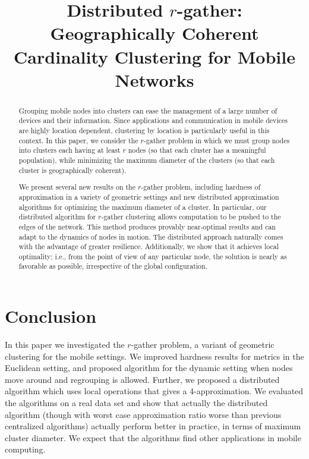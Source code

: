 \documentclass[conference]{IEEEtran}
\title{Distributed $r$-gather: Geographically Coherent Cardinality Clustering for Mobile Networks}
\begin{document}
\maketitle


\begin{abstract}

Grouping mobile nodes into clusters can ease the management of a large number of devices and their information. Since applications and communication in mobile devices are highly location dependent, clustering by location is particularly useful in this context. In this paper, we consider the $r$-gather problem in which we must group nodes into clusters each having at least $r$ nodes (so that each cluster has a meaningful population), while minimizing the maximum diameter of the clusters (so that each cluster is geographically coherent).

We present several new results on the $r$-gather problem, including hardness of approximation in a variety of geometric settings and new distributed approximation algorithms for optimizing the maximum diameter of a cluster. In particular, our distributed algorithm for $r$-gather clustering allows computation to be pushed to the edges of the network. This method produces provably near-optimal results and can adapt to the dynamics of nodes in motion. The distributed approach naturally comes with the advantage of greater resilience. Additionally, we show that it achieves local optimality; i.e., from the point of view of any particular node, the solution is nearly as favorable as possible, irrespective of the global configuration. 

\end{abstract} 


%




\section{Conclusion}
In this paper we investigated the $r$-gather problem, a variant of geometric clustering for the mobile settings. We improved hardness results for metrics in the Euclidean setting, and proposed algorithm for the dynamic setting when nodes move around and regrouping is allowed. Further, we proposed a distributed algorithm which uses local operations that gives a $4$-approximation. We evaluated the algorithms on a real data set and show that actually the distributed algorithm (though with worst case approximation ratio worse than previous centralized algorithms) actually perform better in practice, in terms of maximum cluster diameter. We expect that the algorithms find other applications in mobile computing. 



\begin{small}


\end{small}
\end{document}
